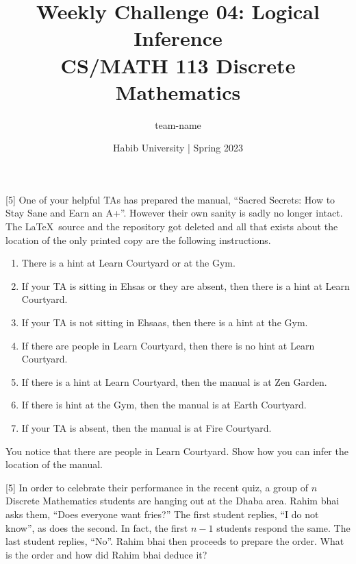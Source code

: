 \documentclass[a4paper]{exam}
\title{Weekly Challenge 04: Logical Inference\\CS/MATH 113 Discrete Mathematics}
\author{team-name}  %
\date{Habib University | Spring 2023}
\begin{document}
\maketitle

\begin{questions}

  [5] One of your helpful TAs has prepared the manual, ``Sacred Secrets: How to Stay Sane and Earn an A+''. However their own sanity is sadly no longer intact. The \LaTeX\ source and the repository got deleted and all that exists about the location of the only printed copy are the following instructions.
  \begin{enumerate}
  \item There is a hint at Learn Courtyard or at the Gym.
  \item If your TA is sitting in Ehsas or they are absent, then there is a hint at Learn Courtyard.
  \item If your TA is not sitting in Ehsaas, then there is a hint at the Gym.
  \item If there are people in Learn Courtyard, then there is no hint at Learn Courtyard.
  \item If there is a hint at Learn Courtyard, then the manual is at Zen Garden.
  \item If there is hint at the Gym, then the manual is at Earth Courtyard.
  \item If your TA is absent, then the manual is at Fire Courtyard.
  \end{enumerate}
  You notice that there are people in Learn Courtyard. Show how you can infer the location of the manual.

  \begin{solution}
  \end{solution}

  [5] In order to celebrate their performance in the recent quiz, a group of $n$ Discrete Mathematics students are hanging out at the Dhaba area. Rahim bhai asks them, ``Does everyone want fries?'' The first student replies, ``I do not know'', as does the second. In fact, the first $n-1$ students respond the same. The last student replies, ``No''. Rahim bhai then proceeds to prepare the order. What is the order and how did Rahim bhai deduce it?

  \begin{solution}
  \end{solution}

  
\end{questions}
\end{document}
